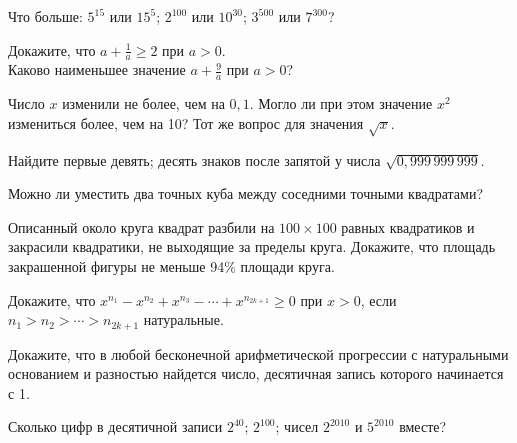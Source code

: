 \documentclass[a4paper,12pt]{article}
\begin{document}


 Что больше:
 $5^{15}$ или $15^5$;
 $2^{100}$ или $10^{30}$;
 $3^{500}$ или $7^{300}$?

 Докажите, что %
$\displaystyle{a+\frac1a\ge 2}$ при $a>0$.\\
 Каково наименьшее значение %
$\displaystyle{a+\frac9a}$ при $a>0$?

Число $x$ изменили не более, чем на $0,1$.
Могло ли при этом значение $x^2$ измениться более, чем на 10?
Тот же вопрос для значения $\sqrt x$.

 Найдите первые
 девять;
 десять знаков после запятой у числа $\sqrt{0,999\,999\,999}$.

Можно ли уместить два точных куба между соседними точными квадратами?

 Описанный около круга квадрат разбили на $100\times100$
равных квадратиков и закрасили квадратики, не выходящие
за пределы круга. Докажите, что площадь %
закрашенной фигуры
не меньше 94\% площади круга.

Докажите, что $x^{n_1}-x^{n_2}+x^{n_3}-\cdots +x^{n_{2k+1}}\ge 0$ при $x>0$, если %
$n_1>n_2>\cdots >n_{2k+1}$ натуральные. %

Докажите, что в любой бесконечной арифметической прогрессии с натуральными
основанием и разностью найдется число, десятичная запись которого
начинается с 1.







 Сколько цифр в десятичной записи %
 $2^{40}$;  $2^{100}$;
 чисел $2^{2010}$ и $5^{2010}$ вместе?
\end{document}
